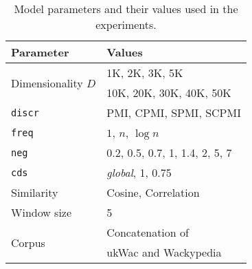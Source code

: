 \begin{table}
  \centering
  \begin{tabular}{ll}
    \toprule
    Parameter & Values \\
    \midrule
    \multirow{2}{*}{Dimensionality $D$} & 1K, 2K, 3K, 5K \\
                                    & 10K, 20K, 30K, 40K, 50K \\
    \texttt{discr} & PMI, CPMI, SPMI, SCPMI \\
    \texttt{freq} & $1$, $n$, $\log n$ \\
    \texttt{neg} & 0.2, 0.5, 0.7, 1, 1.4, 2, 5, 7 \\
    \texttt{cds} & \textit{global}, 1, 0.75 \\
    Similarity & Cosine, Correlation \\
    Window size & 5                                \\
    \multirow{2}{*}{Corpus} & Concatenation of \\
                            & ukWac and Wackypedia \\
    \bottomrule
  \end{tabular}
  \caption{Model parameters and their values used in the experiments.}
\label{tab:parameters}
\end{table}

